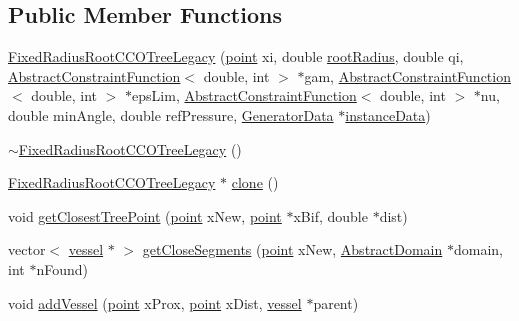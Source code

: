 \subsection*{Public Member Functions}
\begin{DoxyCompactItemize}
\item 
\mbox{\hyperlink{class_fixed_radius_root_c_c_o_tree_legacy_a423950865b90803617be124a13e8b660}{Fixed\+Radius\+Root\+C\+C\+O\+Tree\+Legacy}} (\mbox{\hyperlink{structpoint}{point}} xi, double \mbox{\hyperlink{class_fixed_radius_root_c_c_o_tree_legacy_a21b54a45c92fe9c86a3a566966127048}{root\+Radius}}, double qi, \mbox{\hyperlink{class_abstract_constraint_function}{Abstract\+Constraint\+Function}}$<$ double, int $>$ $\ast$gam, \mbox{\hyperlink{class_abstract_constraint_function}{Abstract\+Constraint\+Function}}$<$ double, int $>$ $\ast$eps\+Lim, \mbox{\hyperlink{class_abstract_constraint_function}{Abstract\+Constraint\+Function}}$<$ double, int $>$ $\ast$nu, double min\+Angle, double ref\+Pressure, \mbox{\hyperlink{class_generator_data}{Generator\+Data}} $\ast$\mbox{\hyperlink{class_abstract_c_c_o_tree_afd240b7fad46ddf0a2ed78558cc9b9ca}{instance\+Data}})
\item 
\mbox{\hyperlink{class_fixed_radius_root_c_c_o_tree_legacy_a4cf9e8bf1edd2cb4c7f22a3deb9b52ff}{$\sim$\+Fixed\+Radius\+Root\+C\+C\+O\+Tree\+Legacy}} ()
\item 
\mbox{\hyperlink{class_fixed_radius_root_c_c_o_tree_legacy}{Fixed\+Radius\+Root\+C\+C\+O\+Tree\+Legacy}} $\ast$ \mbox{\hyperlink{class_fixed_radius_root_c_c_o_tree_legacy_a7ee8da3159245b4000e631c199762f61}{clone}} ()
\item 
void \mbox{\hyperlink{class_fixed_radius_root_c_c_o_tree_legacy_a43a7c1b6584b258580538764f0a17c18}{get\+Closest\+Tree\+Point}} (\mbox{\hyperlink{structpoint}{point}} x\+New, \mbox{\hyperlink{structpoint}{point}} $\ast$x\+Bif, double $\ast$dist)
\item 
vector$<$ \mbox{\hyperlink{structvessel}{vessel}} $\ast$ $>$ \mbox{\hyperlink{class_fixed_radius_root_c_c_o_tree_legacy_affd26c5ca4319ea7f207e4eb1bfea6b1}{get\+Close\+Segments}} (\mbox{\hyperlink{structpoint}{point}} x\+New, \mbox{\hyperlink{class_abstract_domain}{Abstract\+Domain}} $\ast$domain, int $\ast$n\+Found)
\item 
void \mbox{\hyperlink{class_fixed_radius_root_c_c_o_tree_legacy_a8322a2cf314cae0c93db3e0d53f4942b}{add\+Vessel}} (\mbox{\hyperlink{structpoint}{point}} x\+Prox, \mbox{\hyperlink{structpoint}{point}} x\+Dist, \mbox{\hyperlink{structvessel}{vessel}} $\ast$parent)

\end{DoxyCompactItemize}
